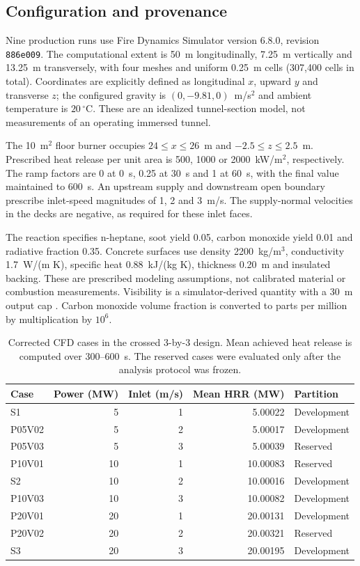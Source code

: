 \documentclass[preprint,12pt,authoryear]{elsarticle}
\begin{document}
\subsection{Configuration and provenance}
Nine production runs use Fire Dynamics Simulator version 6.8.0,
revision \texttt{886e009}. The computational extent is 50~m longitudinally,
7.25~m vertically and 13.25~m transversely, with four meshes and uniform
0.25~m cells (307,400 cells in total). Coordinates are explicitly defined
as longitudinal $x$, upward $y$ and transverse $z$; the configured gravity
is $(0,-9.81,0)$~m/s$^2$ and ambient temperature is $20\,^{\circ}$C.
These are an idealized tunnel-section model, not measurements of an
operating immersed tunnel.

The 10~m$^2$ floor burner occupies $24\leq x\leq26$~m and
$-2.5\leq z\leq2.5$~m. Prescribed heat release per unit area is
500, 1000 or 2000~kW/m$^2$, respectively. The ramp factors are 0 at
0~s, 0.25 at 30~s and 1 at 60~s, with the final value maintained to
600~s. An upstream supply and downstream open boundary prescribe
inlet-speed magnitudes of 1, 2 and 3~m/s. The supply-normal velocities
in the decks are negative, as required for these inlet faces.

The reaction specifies n-heptane, soot yield 0.05, carbon monoxide yield
0.01 and radiative fraction 0.35. Concrete surfaces use density
2200~kg/m$^3$, conductivity 1.7~W/(m K), specific heat
0.88~kJ/(kg K), thickness 0.20~m and insulated backing. These are
prescribed modeling assumptions, not calibrated material or combustion
measurements. Visibility is a simulator-derived quantity with a 30~m
output cap \citep{FDS680Criteria}. Carbon monoxide volume fraction is
converted to parts per million by multiplication by $10^6$.

\begin{table}[htbp]\centering\small
\caption{Corrected CFD cases in the crossed 3-by-3 design. Mean achieved
heat release is computed over 300--600~s. The reserved cases were evaluated
only after the analysis protocol was frozen.}
\label{tab:cases}
\begin{tabular}{@{}lrrrl@{}}\toprule
Case & Power (MW) & Inlet (m/s) & Mean HRR (MW) & Partition\\
\midrule
S1      & 5  & 1 & 5.00022  & Development\\
P05V02  & 5  & 2 & 5.00017  & Development\\
P05V03  & 5  & 3 & 5.00039  & Reserved\\
P10V01  & 10 & 1 & 10.00083 & Reserved\\
S2      & 10 & 2 & 10.00016 & Development\\
P10V03  & 10 & 3 & 10.00082 & Development\\
P20V01  & 20 & 1 & 20.00131 & Development\\
P20V02  & 20 & 2 & 20.00321 & Reserved\\
S3      & 20 & 3 & 20.00195 & Development\\\bottomrule
\end{tabular}
\end{table}
\end{document}
